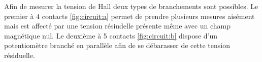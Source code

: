 \begin{minipage}
    Afin de mesurer la tension de Hall deux types de branchements sont possibles. Le premier à 4 contacts \autoref{fig:circuit:a} permet de prendre plusieurs mesures aisément mais est affecté par une tension résiudelle présente même avec un champ magnétique nul. Le deuxième à 5 contacts \autoref{fig:circuit:b} dispose d'un potentiomètre branché en parallèle afin de se débarasser de cette tension résiduelle.
    
\end{minipage}